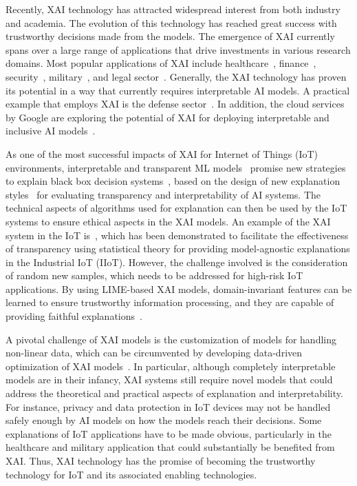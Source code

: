 \documentclass[journal]{IEEEtran}
\begin{document}
Recently, XAI technology has attracted widespread interest from both industry and academia. The evolution of this technology has reached great success with trustworthy decisions made from the models. The emergence of XAI currently spans over a large range of applications that drive investments in various research domains. Most popular applications of XAI include healthcare~\cite{nazar2021systematic}, finance~\cite{kute2021deep}, security~\cite{zolanvari2021trust}, military~\cite{warren2020friend}, and legal sector~\cite{deeks2019judicial}. Generally, the XAI technology has proven its potential in a way that currently requires interpretable AI models. A practical example that employs XAI is the defense sector~\cite{gunning2019darpa}. In addition, the cloud services by Google are exploring the potential of XAI for deploying interpretable and inclusive AI models~\cite{kumara2022focloud}. 

As one of the most successful impacts of XAI for Internet of Things (IoT) environments, interpretable and transparent ML models~\cite{lipton2018mythos} promise new strategies to explain black box decision systems~\cite{guidotti2018survey}, based on the design of new explanation styles~\cite{van2021evaluating} for evaluating transparency and interpretability of AI systems. The technical aspects of algorithms used for explanation can then be used by the IoT systems to ensure ethical aspects in the XAI models. An example of the XAI system in the IoT is~\cite{zolanvari2021trust}, which has been demonstrated to facilitate the effectiveness of transparency using statistical theory for providing model-agnostic explanations in the Industrial IoT (IIoT). However, the challenge involved is the consideration of random new samples, which needs to be addressed for high-risk IoT applications. By using LIME-based XAI models, domain-invariant features can be learned to ensure trustworthy information processing, and they are capable of providing faithful explanations~\cite{walambe2022explainable}.

A pivotal challenge of XAI models is the customization of models for handling non-linear data, which can be circumvented by developing data-driven optimization of XAI models~\cite{hewitt2020data}. In particular, although completely interpretable models are in their infancy, XAI systems still require novel models that could address the theoretical and practical aspects of explanation and interpretability. For instance, privacy and data protection in IoT devices may not be handled safely enough by AI models on how the models reach their decisions. Some explanations of IoT applications have to be made obvious, particularly in the healthcare and military application that could substantially be benefited from XAI. Thus, XAI technology has the promise of becoming the trustworthy technology for IoT and its associated enabling technologies.
\end{document}

